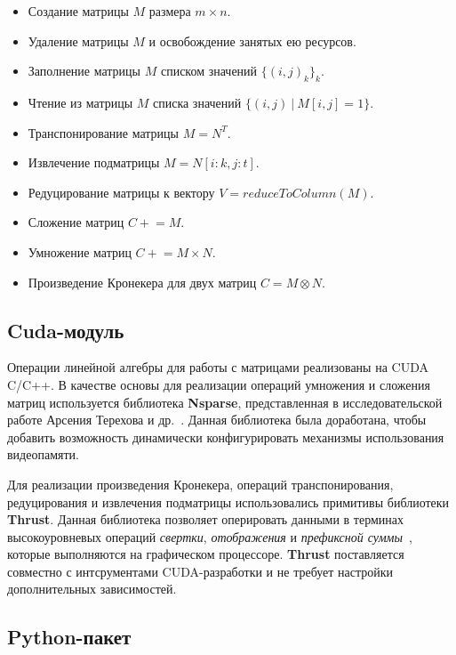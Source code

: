 \begin{itemize}[noitemsep,topsep=0pt,parsep=0pt,partopsep=0pt]
    \item Создание матрицы $M$ размера $m \times n$.
    \item Удаление матрицы $M$ и освобождение занятых ею ресурсов.
    \item Заполнение матрицы $M$ списком значений $\{(i, j)_k\}_k$.
    \item Чтение из матрицы $M$ списка значений $\{(i, j)~|~M[i,j]=1\}$.
    \item Транспонирование матрицы $M = N^T$.
    \item Извлечение подматрицы $M = N[i:k, j:t]$.
    \item Редуцирование матрицы к вектору $V = \textit{reduceToColumn}(M)$.
    \item Сложение матриц $C \mathrel{+}= M$.
    \item Умножение матриц $C \mathrel{+}= M \times N$.
    \item Произведение Кронекера для двух матриц $C = M \otimes N$.
\end{itemize}

\subsection{Cuda-модуль}

Операции линейной алгебры для работы с матрицами реализованы на CUDA C/C++. 
В качестве основы для реализации операций умножения и сложения матриц используется библиотека \textbf{Nsparse}, представленная в исследовательской работе Арсения Терехова и др.~\cite{inproceedings:cfqp_matrix_with_single_source}.
Данная библиотека была доработана, чтобы добавить возможность динамически конфигурировать механизмы использования видеопамяти. 

Для реализации произведения Кронекера, операций транспонирования, редуцирования и извлечения подматрицы использовались примитивы библиотеки \textbf{Thrust}.
Данная библиотека позволяет оперировать данными в терминах высокоуровневых операций \textit{свертки}, \textit{отображения} и \textit{префиксной суммы}~\cite{net:cuda_thrust}, которые выполняются на графическом процессоре. 
\textbf{Thrust} поставляется совместно с интсрументами CUDA-разработки и не требует настройки дополнительных зависимостей.

\subsection{Python-пакет}

